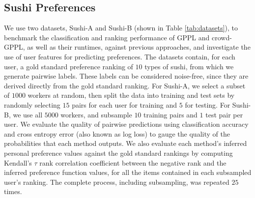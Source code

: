 \subsection{Sushi Preferences}\label{sec:sushi}

We use two datasets, Sushi-A and Sushi-B (shown in Table \ref{tab:datasets}),
to benchmark the classification and ranking performance of GPPL and crowd-GPPL, 
as well as their runtimes, against previous approaches, 
and investigate the use of user features for predicting preferences.
The datasets contain, for each user, a gold standard preference ranking of $10$ types of sushi,
from which we generate pairwise labels. These labels can be considered noise-free, since
they are derived directly from the gold standard ranking.  
For Sushi-A, we select a subset of $1000$ workers at random, then 
split the data into training and test sets by randomly
selecting $15$ pairs for each user for training and $5$ for testing. 
For Sushi-B, we use all $5000$ workers, and subsample $10$ training pairs and $1$ test pair
per user.
We evaluate the quality of pairwise predictions using classification accuracy and cross entropy 
error (also known as log loss) to gauge the quality of the probabilities that each method outputs.
We also evaluate each method's inferred personal preference values
against the gold standard rankings by computing Kendall's $\tau$ rank correlation
coefficient between the negative rank and the inferred preference function values,
for all the items contained in each subsampled user's ranking.
The complete process, including subsampling, was repeated $25$ times.




